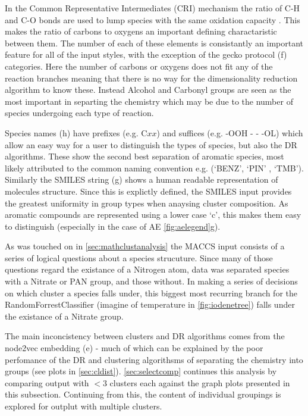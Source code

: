  In the Common Representative Intermediates (CRI) mechanism the ratio of C-H and C-O bonds are used to lump species with the same oxidation capacity \citep{cri}. This makes the ratio of carbons to oxygens an important defining charactaristic between them. The number of each of these elements is consistantly an important feature for all of the input styles, with the exception of the gecko protocol (f) categories. Here the number of carbons or oxygens does not fit any of the reaction branches meaning that there is no way for the dimensionality reduction algorithm to know these. Instead Alcohol and Carbonyl groups are seen as the most important in separting the chemistry which may be due to the number of species undergoing each type of reaction. 
 
 Species names (h) have prefixes (e.g. C$xx$) and suffices (e.g. -OOH - - -OL) which allow an easy way for a user to distinguish the types of species, but also the DR algorithms. These show the second best separation of aromatic species, most likely attributed to the common naming convention e.g. (`BENZ', `PIN' , `TMB'). Similarly the SMILES string (g) shows a human readable representation of molecules structure. Since this is explictly defined, the SMILES input provides the greatest uniformity in group types when anaysing cluster composition. As aromatic compounds are represented using a lower case `c', this makes them easy to distinguish (especially in the case of AE \autoref{fig:aelegend}g). 
 
 As was touched on  in \autoref{sec:mathclustanalysis} the MACCS input consists of a series of logical questions about a species strucuture. Since many of those questions regard the existance of a Nitrogen atom, data was separated species with a Nitrate or PAN group, and those without. In making a series of decisions on which cluster a species falls under, this biggest most recurring branch for the RandomForrestClassifier (imagine of temperature in \autoref{fig:iodenetree}) falls under the existance of a Nitrate group. 
 
 The main inconcistency between clusters and DR algorithms comes from the node2vec embedding (e) - much of which can be explained by the poor perfomance of the DR and clustering algorithsms of separating the chemistry into groups (see plots in \autoref{sec:cldist}). \autoref{sec:selectcomp} continues this analysis by comparing output with $<3$ clusters each against the graph plots presented in this subsection. Continuing from this, the content of individual groupings is explored for outplut with multiple clusters. 
 
